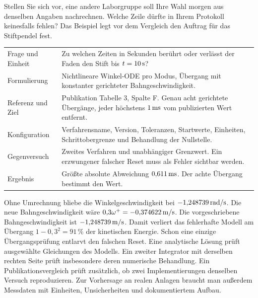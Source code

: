 Stellen Sie sich vor, eine andere Laborgruppe soll Ihre Wahl morgen aus denselben Angaben nachrechnen. Welche Zeile dürfte in Ihrem Protokoll keinesfalls fehlen? Das Beispiel legt vor dem Vergleich den Auftrag für das Stiftpendel fest.
{\tblstart\begin{tabularx}{\linewidth}{@{}P{39mm}Y@{}}\toprule
{}&\\\midrule
Frage und Einheit&Zu welchen Zeiten in Sekunden berührt oder verlässt der Faden den Stift bis \(t=10\,\mathrm{s}\)?\\
Formulierung&Nichtlineare Winkel-ODE pro Modus, Übergang mit konstanter gerichteter Bahngeschwindigkeit.\\
Referenz und Ziel&Publikation Tabelle 3, Spalte F. Genau acht gerichtete Übergänge, jeder höchstens \(1\,\mathrm{ms}\) vom publizierten Wert entfernt.\\
Konfiguration&Verfahrensname, Version, Toleranzen, Startwerte, Einheiten, Schrittobergrenze und Behandlung der Nullstelle.\\
Gegenversuch&Zweites Verfahren und unabhängiger Grenzwert. Ein erzwungener falscher Reset muss als Fehler sichtbar werden.\\
Ergebnis&Größte absolute Abweichung \(0{,}611\,\mathrm{ms}\). Der achte Übergang bestimmt den Wert.\\\bottomrule\end{tabularx}\par}
Ohne Umrechnung bliebe die Winkelgeschwindigkeit bei \(-1{,}248739\,\mathrm{rad/s}\). Die neue Bahngeschwindigkeit wäre \(0{,}3\omega^+=-0{,}374622\,\mathrm{m/s}\). Die vorgeschriebene Bahngeschwindigkeit ist \(-1{,}248739\,\mathrm{m/s}\). Damit verliert das fehlerhafte Modell am Übergang \(1-0{,}3^2=91\,\%\) der kinetischen Energie. Schon eine einzige Übergangsprüfung entlarvt den falschen Reset.
Eine analytische Lösung prüft ausgewählte Gleichungen des Modells. Ein zweiter Integrator mit derselben rechten Seite prüft insbesondere deren numerische Behandlung. Ein Publikationsvergleich prüft zusätzlich, ob zwei Implementierungen denselben Versuch reproduzieren. Zur Vorhersage an realen Anlagen braucht man außerdem Messdaten mit Einheiten, Unsicherheiten und dokumentiertem Aufbau.

